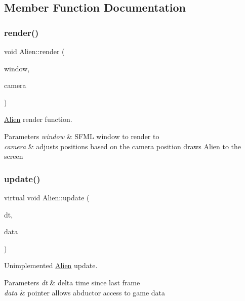 \subsection{Member Function Documentation}
\mbox{\label{class_alien_a8d407e6ec7a582cefe9d7e37b1b3b063}} 
\subsubsection{\texorpdfstring{render()}{render()}}
{\footnotesize\ttfamily void Alien\+::render (\begin{DoxyParamCaption}\item[{sf\+::\+Render\+Window $\ast$}]{window,  }\item[{\hyperlink{class_camera}{Camera} $\ast$}]{camera }\end{DoxyParamCaption})}



\hyperlink{class_alien}{Alien} render function. 


\begin{DoxyParams}{Parameters}
{\em window} & S\+F\+ML window to render to \\
\hline
{\em camera} & adjusts positions based on the camera position draws \hyperlink{class_alien}{Alien} to the screen \\
\hline
\end{DoxyParams}
\mbox{\label{class_alien_afdf9627be2ad37372174a250540dd47b}} 
\subsubsection{\texorpdfstring{update()}{update()}}
{\footnotesize\ttfamily virtual void Alien\+::update (\begin{DoxyParamCaption}\item[{float}]{dt,  }\item[{\hyperlink{class_alien_manager}{Alien\+Manager} $\ast$}]{data }\end{DoxyParamCaption})\hspace{0.3cm}{\ttfamily [pure virtual]}}



Unimplemented \hyperlink{class_alien}{Alien} update. 


\begin{DoxyParams}{Parameters}
{\em dt} & delta time since last frame \\
\hline
{\em data} & pointer allows abductor access to game data \\
\hline
\end{DoxyParams}


